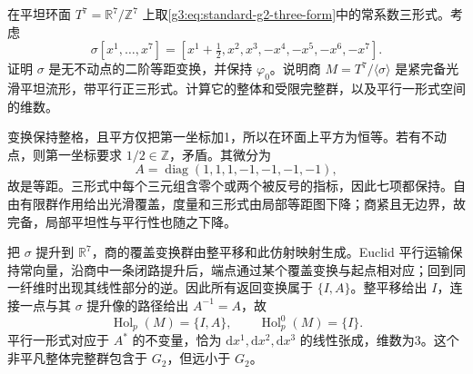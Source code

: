 \begin{optionalexercise}\label{g3:ex:flat-g2-quotient}
	在平坦环面 \(T^7=\mathbb R^7/\mathbb Z^7\) 上取\eqref{g3:eq:standard-g2-three-form}中的常系数三形式。考虑
	\[
		\sigma[x^1,\ldots,x^7]
		=[x^1+\tfrac12,x^2,x^3,-x^4,-x^5,-x^6,-x^7].
	\]
	证明 \(\sigma\) 是无不动点的二阶等距变换，并保持 \(\varphi_0\)。说明商 \(M=T^7/\langle\sigma\rangle\) 是紧完备光滑平坦流形，带平行正三形式。计算它的整体和受限完整群，以及平行一形式空间的维数。
\end{optionalexercise}
\begin{solution}
	变换保持整格，且平方仅把第一坐标加1，所以在环面上平方为恒等。若有不动点，则第一坐标要求 \(1/2\in\mathbb Z\)，矛盾。其微分为
	\[
		A=\operatorname{diag}(1,1,1,-1,-1,-1,-1),
	\]
	故是等距。三形式中每个三元组含零个或两个被反号的指标，因此七项都保持。自由有限群作用给出光滑覆盖，度量和三形式由局部等距图下降；商紧且无边界，故完备，局部平坦性与平行性也随之下降。

	把 \(\sigma\) 提升到 \(\mathbb R^7\)，商的覆盖变换群由整平移和此仿射映射生成。Euclid 平行运输保持常向量，沿商中一条闭路提升后，端点通过某个覆盖变换与起点相对应；回到同一纤维时出现其线性部分的逆。因此所有返回变换属于 \(\{I,A\}\)。整平移给出 \(I\)，连接一点与其 \(\sigma\) 提升像的路径给出 \(A^{-1}=A\)，故
	\[
		\operatorname{Hol}_p(M)=\{I,A\},\qquad
		\operatorname{Hol}_p^0(M)=\{I\}.
	\]
	平行一形式对应于 \(A^*\) 的不变量，恰为 \(\mathrm dx^1,\mathrm dx^2,\mathrm dx^3\) 的线性张成，维数为3。这个非平凡整体完整群包含于 \(G_2\)，但远小于 \(G_2\)。
\end{solution}

